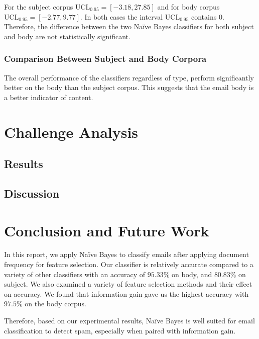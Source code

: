 \documentclass[10pt, a4paper]{article}
\begin{document}
For the subject corpus $\text{UCL}_{0.95} = [-3.18, 27.85]$ and for body corpus $\text{UCL}_{0.95} = [-2.77, 9.77]$. In both cases the interval $\text{UCL}_{0.95}$ contains 0. Therefore, the difference between the two Na\"ive Bayes classifiers for both subject and body are not statistically significant.

\subsubsection{Comparison Between Subject and Body Corpora}

The overall performance of the classifiers regardless of type, perform significantly better on the body than the subject corpus. This suggests that the email body is a better indicator of content.

\section{Challenge Analysis}



\subsection{Results}

\subsection{Discussion}

\section{Conclusion and Future Work}


In this report, we apply Na\"ive Bayes to classify emails after applying document frequency for feature selection. Our classifier is relatively accurate compared to a variety of other classifiers with an accuracy of $95.33\%$ on body, and $80.83\%$ on subject. We also examined a variety of feature selection methods and their effect on accuracy. We found that information gain gave us the highest accuracy with $97.5\%$ on the body corpus.

Therefore, based on our experimental results, Na\"ive Bayes is well suited for email classification to detect spam, especially when paired with information gain. 
\end{document}
